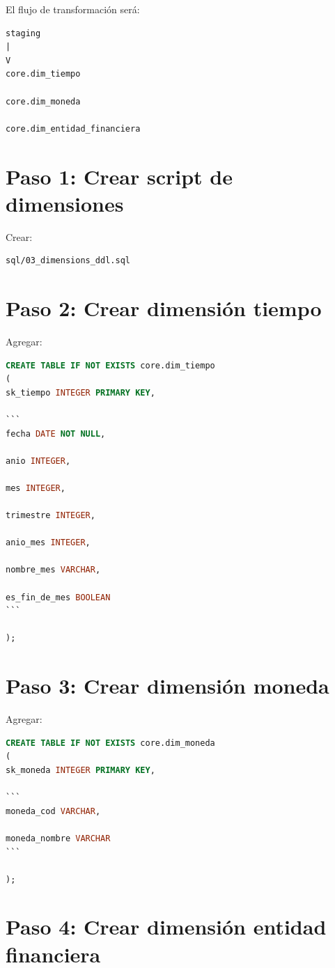 El flujo de transformación será:

\begin{verbatim}
staging
|
V
core.dim_tiempo

core.dim_moneda

core.dim_entidad_financiera
\end{verbatim}

\section{Paso 1: Crear script de dimensiones}

Crear:

\begin{verbatim}
sql/03_dimensions_ddl.sql
\end{verbatim}

\section{Paso 2: Crear dimensión tiempo}

Agregar:

\begin{lstlisting}[language=SQL]
CREATE TABLE IF NOT EXISTS core.dim_tiempo
(
sk_tiempo INTEGER PRIMARY KEY,

```
fecha DATE NOT NULL,

anio INTEGER,

mes INTEGER,

trimestre INTEGER,

anio_mes INTEGER,

nombre_mes VARCHAR,

es_fin_de_mes BOOLEAN
```

);
\end{lstlisting}

\section{Paso 3: Crear dimensión moneda}

Agregar:

\begin{lstlisting}[language=SQL]
CREATE TABLE IF NOT EXISTS core.dim_moneda
(
sk_moneda INTEGER PRIMARY KEY,

```
moneda_cod VARCHAR,

moneda_nombre VARCHAR
```

);
\end{lstlisting}

\section{Paso 4: Crear dimensión entidad financiera}

